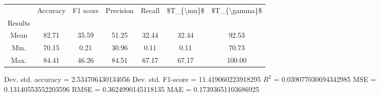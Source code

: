 \begin{tabular}{|c|c|c|c|c|c|c|}
\toprule
{} &  Accuracy &  F1 score &  Precision &  Recall &  \$T\_\{\textbackslash mu\}\$ &  \$T\_\{\textbackslash gamma\}\$ \\
Results &           &           &            &         &            &               \\
\hline
Mean    &     82.71 &     35.59 &      51.25 &   32.44 &      32.44 &         92.53 \\
Min.    &     70.15 &      0.21 &      30.96 &    0.11 &       0.11 &         70.73 \\
Max.    &     84.41 &     46.26 &      84.51 &   67.17 &      67.17 &        100.00 \\
\bottomrule
\end{tabular}

 Dev. std. accuracy = 2.534706430134056
 Dev. std. F1-score = 11.419060223918295
 $R^2$ = 0.039077030694342985
 MSE = 0.13140553552203596
 RMSE = 0.3624990145118135
 MAE = 0.17393651103686925